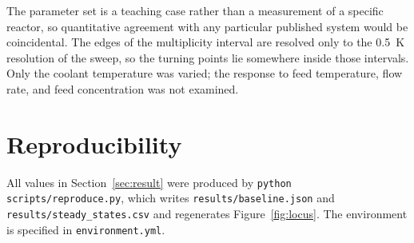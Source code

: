 \documentclass[11pt]{article}
\begin{document}
The parameter set is a teaching case rather than a measurement of a specific
reactor, so quantitative agreement with any particular published system would be
coincidental. The edges of the multiplicity interval are resolved only to the
0.5~K resolution of the sweep, so the turning points lie somewhere inside those
intervals. Only the coolant temperature was varied; the response to feed
temperature, flow rate, and feed concentration was not examined.

\section{Reproducibility}
\label{sec:repro}

All values in Section~\ref{sec:result} were produced by
\texttt{python scripts/reproduce.py}, which writes
\texttt{results/baseline.json} and \texttt{results/steady\_states.csv} and
regenerates Figure~\ref{fig:locus}. The environment is specified in
\texttt{environment.yml}.



\end{document}
